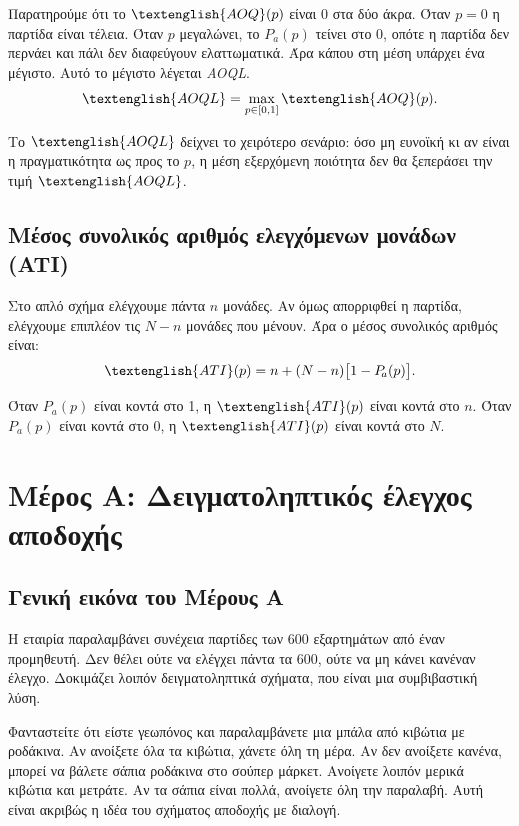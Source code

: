 \documentclass[12pt,a4paper]{article}
\newcommand{\Pa}{P_{\!a}}
\newcommand{\AOQ}{\textenglish{AOQ}}
\newcommand{\AOQL}{\textenglish{AOQL}}
\newcommand{\ATI}{\textenglish{ATI}}
\begin{document}
Παρατηρούμε ότι το \(\AOQ(p)\) είναι 0 στα δύο άκρα. Όταν \(p=0\) η παρτίδα
είναι τέλεια. Όταν \(p\) μεγαλώνει, το \(\Pa(p)\) τείνει στο 0, οπότε η
παρτίδα δεν περνάει και πάλι δεν διαφεύγουν ελαττωματικά. Άρα κάπου στη μέση
υπάρχει ένα μέγιστο. Αυτό το μέγιστο λέγεται \emph{AOQL}.
\[
    \AOQL = \max_{p\in[0,1]}\AOQ(p).
\]

Το \(\AOQL\) δείχνει το χειρότερο σενάριο: όσο μη ευνοϊκή κι αν είναι η
πραγματικότητα ως προς το \(p\), η μέση εξερχόμενη ποιότητα δεν θα ξεπεράσει
την τιμή \(\AOQL\).

\subsection{Μέσος συνολικός αριθμός ελεγχόμενων μονάδων (ATI)}

Στο απλό σχήμα ελέγχουμε πάντα \(n\) μονάδες. Αν όμως απορριφθεί η παρτίδα,
ελέγχουμε επιπλέον τις \(N-n\) μονάδες που μένουν. Άρα ο μέσος συνολικός
αριθμός είναι:
\[
    \ATI(p)=n+(N-n)\bigl[1-\Pa(p)\bigr].
\]

Όταν \(\Pa(p)\) είναι κοντά στο 1, η \(\ATI(p)\) είναι κοντά στο \(n\).
Όταν \(\Pa(p)\) είναι κοντά στο 0, η \(\ATI(p)\) είναι κοντά στο \(N\).

\newpage

\section{Μέρος Α: Δειγματοληπτικός έλεγχος αποδοχής}

\subsection{Γενική εικόνα του Μέρους Α}

Η εταιρία παραλαμβάνει συνέχεια παρτίδες των 600 εξαρτημάτων από έναν
προμηθευτή. Δεν θέλει ούτε να ελέγχει πάντα τα 600, ούτε να μη κάνει κανέναν
έλεγχο. Δοκιμάζει λοιπόν δειγματοληπτικά σχήματα, που είναι μια συμβιβαστική
λύση.

\begin{intuition}
Φανταστείτε ότι είστε γεωπόνος και παραλαμβάνετε μια μπάλα από κιβώτια με
ροδάκινα. Αν ανοίξετε όλα τα κιβώτια, χάνετε όλη τη μέρα. Αν δεν ανοίξετε
κανένα, μπορεί να βάλετε σάπια ροδάκινα στο σούπερ μάρκετ. Ανοίγετε λοιπόν
μερικά κιβώτια και μετράτε. Αν τα σάπια είναι πολλά, ανοίγετε όλη την
παραλαβή. Αυτή είναι ακριβώς η ιδέα του σχήματος αποδοχής με διαλογή.
\end{intuition}
\end{document}
